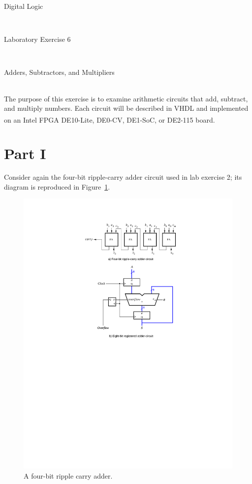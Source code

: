 \documentclass[epsfig,10pt,fullpage]{article}
\newcommand{\LabNum}{6}
\begin{document}
\centerline{\huge Digital Logic}
~\\
\centerline{\huge Laboratory Exercise \LabNum}
~\\
\centerline{\large Adders, Subtractors, and Multipliers}
~\\

The purpose of this exercise is to examine arithmetic circuits that add, subtract,
and multiply numbers. Each circuit will be described in VHDL and implemented on an 
Intel\textsuperscript{\textregistered} FPGA DE10-Lite, DE0-CV, DE1-SoC, or DE2-115 board.

\section*{Part I}
Consider again the four-bit ripple-carry adder circuit used in lab exercise 2; its diagram is reproduced in Figure~\ref{fig:ripple_carry}.

\begin{figure}[H]
\centerline{
\includegraphics{figures/ripple_carry}}
\caption{A four-bit ripple carry adder.}
\label{fig:ripple_carry}
\end{figure}
\end{document}
